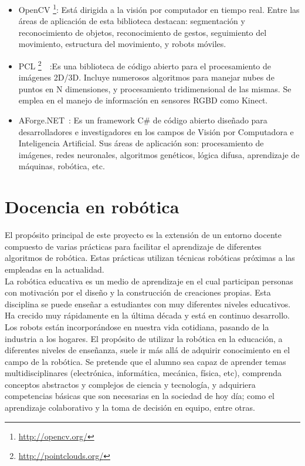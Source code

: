 \begin{itemize}
\item OpenCV \footnote{\url{http://opencv.org/}}: Está dirigida a la visión por computador en tiempo real. Entre las áreas de aplicación de esta biblioteca destacan: segmentación y reconocimiento de objetos, reconocimiento de gestos, seguimiento del movimiento, estructura del movimiento,  y robots móviles.
\item PCL \footnote{\url{http://pointclouds.org/}}~\cite{pcl}~\cite{pcl1}:Es una biblioteca de código abierto para el procesamiento de imágenes 2D/3D. Incluye numerosos algoritmos para manejar nubes  de puntos en N dimensiones, y procesamiento tridimensional de las mismas. Se emplea en el manejo de información en sensores RGBD como Kinect.
\item AForge.NET~\cite{AForge.NET}: Es un framework C\# de código abierto diseñado para desarrolladores e investigadores en los campos de Visión por Computadora e Inteligencia Artificial. Sus áreas de aplicación son: procesamiento de imágenes, redes neuronales, algoritmos genéticos, lógica difusa, aprendizaje de máquinas, robótica, etc.
\end{itemize}

\section{Docencia en robótica}
El propósito principal de este proyecto es la extensión de un entorno docente compuesto de varias prácticas para facilitar el aprendizaje de diferentes algoritmos de robótica. Estas prácticas utilizan técnicas robóticas próximas a las empleadas en la actualidad.\\

La robótica educativa es un medio de aprendizaje en el cual participan personas con motivación por el diseño y la construcción de creaciones propias. Esta disciplina se puede enseñar a estudiantes con muy diferentes niveles educativos. Ha crecido muy rápidamente en la última década y está en continuo desarrollo. Los robots están incorporándose en nuestra vida cotidiana, pasando de la industria a los hogares. El propósito de utilizar la robótica en la educación, a diferentes niveles de enseñanza, suele ir más allá de adquirir conocimiento en el campo de la robótica. Se pretende que el alumno sea capaz de aprender temas multidisciplinares (electrónica, informática, mecánica, física, etc), comprenda conceptos abstractos y complejos de ciencia y tecnología, y adquiriera competencias básicas que son necesarias en la sociedad de hoy día; como el aprendizaje colaborativo y la toma de decisión en equipo, entre otras.\\

